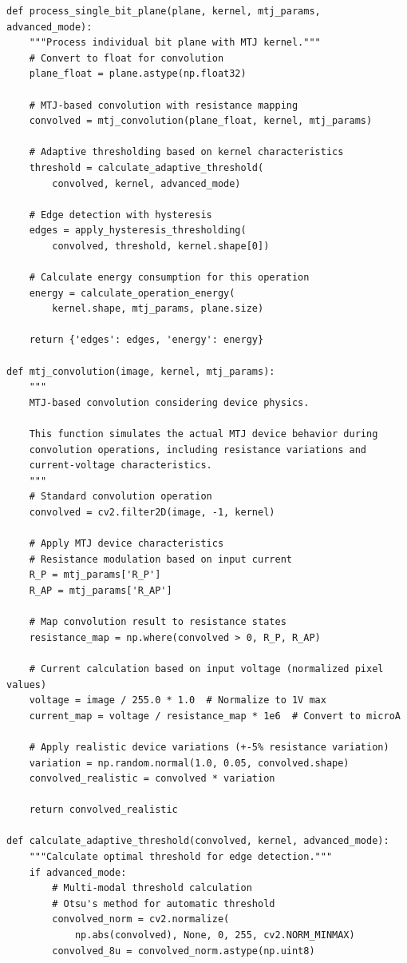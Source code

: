 \documentclass[conference]{IEEEtran}
\begin{document}
\begin{lstlisting}[caption={Complete MTJ edge detection pipeline implementation}]
def process_single_bit_plane(plane, kernel, mtj_params, advanced_mode):
    """Process individual bit plane with MTJ kernel."""
    # Convert to float for convolution
    plane_float = plane.astype(np.float32)
    
    # MTJ-based convolution with resistance mapping
    convolved = mtj_convolution(plane_float, kernel, mtj_params)
    
    # Adaptive thresholding based on kernel characteristics
    threshold = calculate_adaptive_threshold(
        convolved, kernel, advanced_mode)
    
    # Edge detection with hysteresis
    edges = apply_hysteresis_thresholding(
        convolved, threshold, kernel.shape[0])
    
    # Calculate energy consumption for this operation
    energy = calculate_operation_energy(
        kernel.shape, mtj_params, plane.size)
    
    return {'edges': edges, 'energy': energy}

def mtj_convolution(image, kernel, mtj_params):
    """
    MTJ-based convolution considering device physics.
    
    This function simulates the actual MTJ device behavior during 
    convolution operations, including resistance variations and 
    current-voltage characteristics.
    """
    # Standard convolution operation
    convolved = cv2.filter2D(image, -1, kernel)
    
    # Apply MTJ device characteristics
    # Resistance modulation based on input current
    R_P = mtj_params['R_P']
    R_AP = mtj_params['R_AP']
    
    # Map convolution result to resistance states
    resistance_map = np.where(convolved > 0, R_P, R_AP)
    
    # Current calculation based on input voltage (normalized pixel values)
    voltage = image / 255.0 * 1.0  # Normalize to 1V max
    current_map = voltage / resistance_map * 1e6  # Convert to microA
    
    # Apply realistic device variations (+-5% resistance variation)
    variation = np.random.normal(1.0, 0.05, convolved.shape)
    convolved_realistic = convolved * variation
    
    return convolved_realistic

def calculate_adaptive_threshold(convolved, kernel, advanced_mode):
    """Calculate optimal threshold for edge detection."""
    if advanced_mode:
        # Multi-modal threshold calculation
        # Otsu's method for automatic threshold
        convolved_norm = cv2.normalize(
            np.abs(convolved), None, 0, 255, cv2.NORM_MINMAX)
        convolved_8u = convolved_norm.astype(np.uint8)
        

\end{lstlisting}
\end{document}
